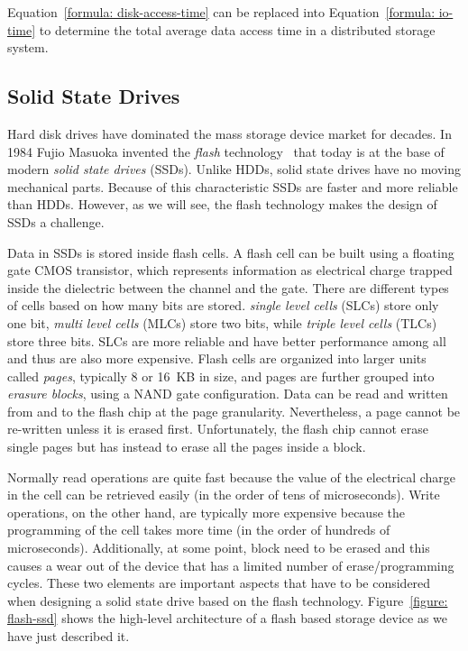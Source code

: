 Equation~\ref{formula: disk-access-time} can be replaced into Equation~\ref{formula: io-time} to determine the total average data access time in a distributed storage system.

\subsection{Solid State Drives}
Hard disk drives have dominated the mass storage device market for decades. In 1984 Fujio Masuoka invented the \textit{flash} technology~\cite{Masuoka1984} that today is at the base of modern \textit{solid state drives} (SSDs). Unlike HDDs, 
solid state drives have no moving mechanical parts. Because of this characteristic SSDs are faster and more reliable than HDDs. However, as we will see, the flash technology makes the design of SSDs a challenge.

Data in SSDs is stored inside flash cells. A flash cell can be built using a floating gate CMOS transistor, which represents information as electrical charge trapped inside the dielectric between the channel and the gate. There are 
different types of cells based on how many bits are stored. \textit{single level cells} (SLCs) store only one bit, \textit{multi level cells} (MLCs) store two bits, while \textit{triple level cells} (TLCs) store three bits. 
SLCs are more reliable and have better performance among all and thus are also more expensive. Flash cells are organized into larger units called \textit{pages}, typically 8 or 16~KB in size, and pages are further grouped 
into \textit{erasure blocks}, using a NAND gate configuration. Data can be read and written from and to the flash chip at the page granularity. Nevertheless, a page cannot be re-written unless it is erased first. Unfortunately, 
the flash chip cannot erase single pages but has instead to erase all the pages inside a block. %

Normally read operations are quite fast because the value of the electrical charge in the cell can be retrieved easily (in the order of tens of microseconds). Write operations, on the other hand, are typically more expensive
because the programming of the cell takes more time (in the order of hundreds of microseconds). Additionally, at some point, block need to be erased and this causes a wear out of the device that has a limited number of
erase/programming cycles. These two elements are important aspects that have to be considered when designing a solid state drive based on the flash technology. Figure~\ref{figure: flash-ssd} shows the high-level architecture
of a flash based storage device as we have just described it.

